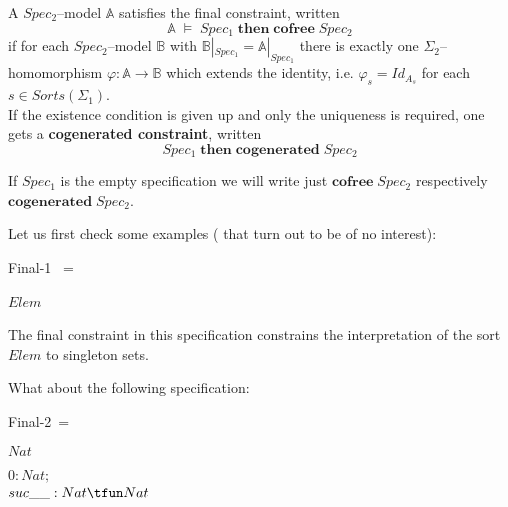 \documentclass[landscape, autoslides, light]{mmiss}
\begin{document}
\begin{Package}[Label={FSDPT}, Title={Formal Specification of Data and Process Types}, ShortTitle={FSDPT}, Authors={Horst Reichel}, Date={February 2003}, LevelOfDetail=Lecture, Language=en-GB]
\begin{Section}[Title={Final Coalgebras as Process Types}, Label={section4}]
\begin{Section}[Title={Final Constraints}, Label={section4_1}]
\begin{Paragraph}[Title={Final Constraints}, Label=Paragraph87]
A $Spec_2$--model $ \mathbb{A}$ satisfies the final constraint,
written $$ \mathbb{A} \; \models \; Spec_1 \; \mathbf{then \;
cofree} \; Spec_2
$$ if for each $Spec_2$--model $ \mathbb{B}$ with
$\mathbb{B}|_{Spec_1} = \mathbb{A}|_{Spec_1}$ there is exactly one
$\Sigma_2$--homomorphism $\varphi : \mathbb{A} \to \mathbb{B}$
which extends the identity, i.e. $\varphi_s = Id_{A_s}$ for each
$s \in Sorts(\Sigma_1)$. \\ \pause If the existence condition is
given up and only the uniqueness is required, one gets a
\textbf{cogenerated constraint}, written
$$Spec_1 \; \mathbf{then \;cogenerated} \; Spec_2 $$


\end{Paragraph}
\begin{Paragraph}[Title={Final Constraints}, Label=Paragraph88]

If $Spec_1$ is the empty specification we will write just
$\mathbf{cofree} \; Spec_2$ respectively $\mathbf{cogenerated} \;
Spec_2$.

Let us first check some examples ( that turn out to be of no
interest):
\begin{SpecDefn}{Final-1} ~=
\item[\Cofree~\Group] \begin{Items} \item[\Sort] \( Elem \)
~\EndGroup
 \end{Items} \End \end{SpecDefn}\pause

The final constraint in this specification constrains the
interpretation of the sort $Elem$ to  singleton sets.

\end{Paragraph}
\begin{Paragraph}[Title={Final Constraints}, Label=Paragraph89]

What about the following specification:\pause

\begin{SpecDefn}{Final-2}~= \item[\Cofree~\Group]
\begin{Items} \item[\Sort] \( Nat \)
\item[\Ops] \( 0 : Nat;\)
\\          \( suc\_\_ : Nat \tfun Nat \)~\EndGroup
\end{Items} \item[\End] \end{SpecDefn}\pause


\end{Paragraph}
\end{Section}
\end{Section}
\end{Package}
\end{document}
